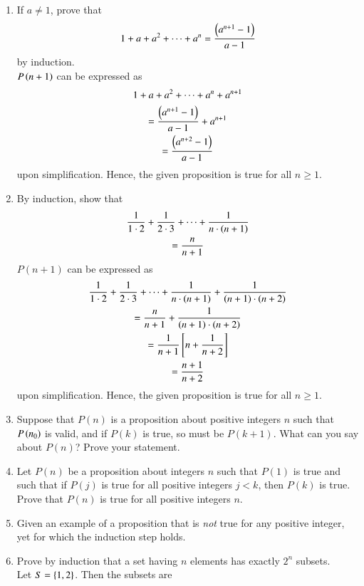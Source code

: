 \begin{enumerate}[label=\arabic*.,ref=\thesubsection.\theenumi]
	\item If $a \ne 1$, prove that 
		\begin{align}
			1 + a + a^2 + \cdots + a^{n} = \frac{\left(a^{n+1}-1\right)}{a-1}
		\end{align}
		by induction.
		\\
		\solution $P\left(n+1\right)$ can be expressed as 
		\begin{multline}
			1 + a + a^2 + \cdots + a^{n} +a^{n+1}
			\\
			= \frac{\left(a^{n+1}-1\right)}{a-1} + a^{n+1}
			\\
			=\frac{\left(a^{n+2}-1\right)}{a-1} 
		\end{multline}
		upon simplification. Hence, the given proposition is true for all $n \ge 1$.
	\item By induction, show that 
		\begin{multline}
			\frac{1}{1\cdot 2}+
			\frac{1}{2\cdot 3}+
\cdots +
			\frac{1}{n\cdot \left(n+1\right)}
			\\
			= \frac{n}{n+1}
		\end{multline}
		\solution $P(n+1)$ can be expressed as
		\begin{multline}
			\frac{1}{1\cdot 2}+
			\frac{1}{2\cdot 3}+
\cdots +
			\frac{1}{n\cdot \left(n+1\right)}+
			\frac{1}{\left(n+1\right)\cdot \left(n+2\right)}
			\\
			= \frac{n}{n+1}+ \frac{1}{\left(n+1\right)\cdot \left(n+2\right)}
			\\
			=
			\frac{1}{n+1}{}\left[n+ \frac{1}{n+2}\right]
			\\
			= \frac{n+1}{n+2}
		\end{multline}
		upon simplification. Hence, the given proposition is true for all $n \ge 1$.
	\item Suppose that $P(n)$ is a proposition about positive integers $n$ such that $P\left(n_0\right)$ is valid, and if $P(k)$ is true, so must be $P(k+1)$. What can you say about $P(n)$?  Prove your statement.
	\item Let $P(n)$ be a proposition about integers $n$ such that $P(1)$ is true and such that if $P(j)$ is true for all positive integers $j < k$, then $P(k)$ is true.  Prove that $P(n)$ is true for all positive integers $n$.
	\item Given an example of  a proposition that is {\em not} true for any positive integer, yet for which the induction step holds.
	\item Prove by induction that a set having $n$ elements has exactly $2^n$ subsets.
	\\
\solution
Let $S = \left\{1,2\right\}$.  Then the subsets are 

\end{enumerate}
